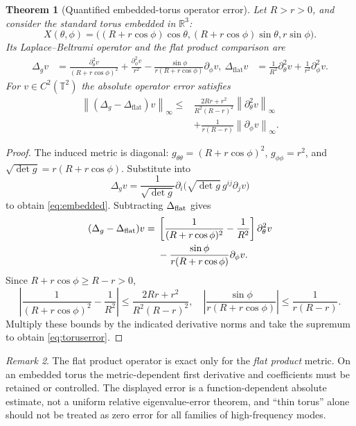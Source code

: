 \documentclass[11pt,letterpaper]{article}
\newtheorem{theorem}{Theorem}[section]
\theoremstyle{definition}
\theoremstyle{remark}
\newtheorem{remark}[theorem]{Remark}
\newcommand{\R}{\mathbb R}
\newcommand{\T}{\mathbb T}
\newcommand{\norm}[1]{\left\lVert#1\right\rVert}
\begin{document}
\begin{theorem}[Quantified embedded-torus operator error]\label{thm:embedded}
Let $R>r>0$, and consider the standard torus embedded in $\R^3$:
\begin{equation*}
X(\theta,\phi)=\bigl((R+r\cos\phi)\cos\theta,
(R+r\cos\phi)\sin\theta,r\sin\phi\bigr).
\end{equation*}
Its Laplace--Beltrami operator and the flat product comparison are
\begin{align}
\Delta_g v&=\frac{\partial_\theta^2v}{(R+r\cos\phi)^2}
+\frac{\partial_\phi^2v}{r^2}
-\frac{\sin\phi}{r(R+r\cos\phi)}\partial_\phi v,
\label{eq:embedded}\
\Delta_{\mathrm{flat}}v&=\frac1{R^2}\partial_\theta^2v
+\frac1{r^2}\partial_\phi^2v.
\end{align}
For $v\in C^2(\T^2)$ the absolute operator error satisfies
\begin{equation}\label{eq:toruserror}
\boxed{\begin{aligned}
\norm{(\Delta_g-\Delta_{\mathrm{flat}})v}_{\infty}
\le{}&\frac{2Rr+r^2}{R^2(R-r)^2}\norm{\partial_\theta^2v}_{\infty}\\
&+\frac1{r(R-r)}\norm{\partial_\phi v}_{\infty}.
\end{aligned}}
\end{equation}
\end{theorem}
\begin{proof}
The induced metric is diagonal:
$g_{\theta\theta}=(R+r\cos\phi)^2$,
$g_{\phi\phi}=r^2$, and
$\sqrt{\det g}=r(R+r\cos\phi)$.
Substitute into
\begin{equation*}
\Delta_gv=\frac1{\sqrt{\det g}}
\partial_i\bigl(\sqrt{\det g}\,g^{ij}\partial_jv\bigr)
\end{equation*}
to obtain \eqref{eq:embedded}. Subtracting $\Delta_{\rm flat}$ gives
\begin{align*}
(\Delta_g-\Delta_{\rm flat})v
={}&\left[\frac1{(R+r\cos\phi)^2}-\frac1{R^2}\right]\partial_\theta^2v\\
&-\frac{\sin\phi}{r(R+r\cos\phi)}\partial_\phi v.
\end{align*}
Since $R+r\cos\phi\ge R-r>0$,
\begin{equation*}
\left|\frac1{(R+r\cos\phi)^2}-\frac1{R^2}\right|
\le\frac{2Rr+r^2}{R^2(R-r)^2},
\quad
\left|\frac{\sin\phi}{r(R+r\cos\phi)}\right|
\le\frac1{r(R-r)}.
\end{equation*}
Multiply these bounds by the indicated derivative norms and take the
supremum to obtain \eqref{eq:toruserror}.
\end{proof}
\begin{remark}
The flat product operator is exact only for the \emph{flat product}
metric. On an embedded torus the metric-dependent first derivative
and coefficients must be retained or controlled. The displayed
error is a function-dependent absolute estimate, not a uniform relative
eigenvalue-error theorem, and ``thin torus'' alone should not be treated
as zero error for all families of high-frequency modes.
\end{remark}
\end{document}
